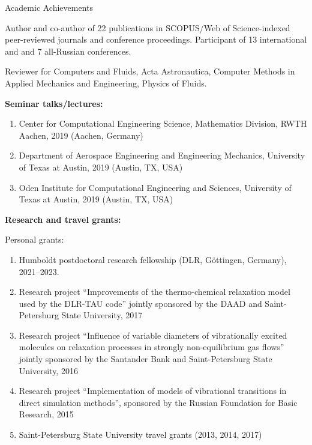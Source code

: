 \documentclass{resume} %
\begin{document}
\begin{rSection}{Academic Achievements}

Author and co-author of 22 publications in SCOPUS/Web of Science-indexed peer-reviewed journals and conference proceedings.
Participant of 13 international and and 7 all-Russian conferences.

Reviewer for Computers and Fluids, Acta Astronautica, Computer Methods in Applied Mechanics and Engineering, Physics of Fluids.

{\bf Seminar talks/lectures:}
\begin{enumerate}
    \item Center for Computational Engineering Science, Mathematics Division, RWTH Aachen, 2019 (Aachen, Germany)
    \item Department of Aerospace Engineering and Engineering Mechanics, University of Texas at Austin, 2019 (Austin, TX, USA)
    \item Oden Institute for Computational Engineering and Sciences, University of Texas at Austin, 2019 (Austin, TX, USA)
\end{enumerate}


{\bf Research and travel grants:}


Personal grants:
\begin{enumerate}

    \item Humboldt postdoctoral research fellowship (DLR,  G\"{o}ttingen, Germany), 2021--2023.
    \item Research project ``Improvements of the thermo-chemical relaxation model used by the DLR-TAU code'' jointly sponsored by the DAAD and Saint-Petersburg State University, 2017
    \item Research project ``Influence of variable diameters of vibrationally excited molecules on relaxation processes in strongly non-equilibrium gas flows'' jointly sponsored by the Santander Bank and Saint-Petersburg State University, 2016
    \item Research project ``Implementation of models of vibrational transitions in direct simulation methods'', sponsored by the Russian Foundation for Basic Research, 2015
    \item Saint-Petersburg State University travel grants (2013, 2014, 2017)

\end{enumerate}



\end{rSection}
\end{document}
